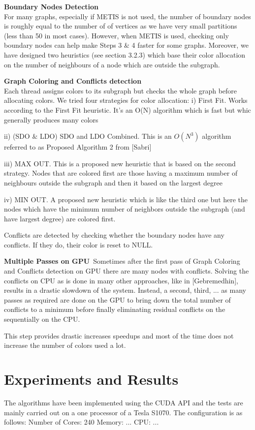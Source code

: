 \documentclass[preprint]{sigplanconf}
\begin{document}
\textbf{Boundary Nodes Detection}\\
For many graphs, especially if METIS is not used, the number of boundary nodes is roughly equal to the number of of vertices as we have very small partitions (less than 50 in most cases). However, when METIS is used, checking only boundary nodes can help make Steps 3 $\&$ 4 faster for some graphs.
Moreover, we have designed two heuristics (see section 3.2.3) which base their color allocation on the number of neighbours of a node which are outside the subgraph.\

\textbf{Graph Coloring  and Conflicts detection}\\
Each thread assigns colors to its subgraph but checks the whole graph before allocating colors. We tried four strategies for color allocation:
i) First Fit. Works according to the First Fit heuristic. It’s an O(N) algorithm which is fast but whic generally produces many colors

ii) (SDO $\&$ LDO) SDO and LDO Combined. This is an $O(N^3)$ algorithm referred to as Proposed Algorithm 2 from [Sabri]

iii) MAX OUT. This is a  proposed new heuristic that is based on the second strategy. Nodes that are colored first are those having a maximum number of neighbours outside the subgraph and then it based on the largest degree

iv) MIN OUT. A proposed new heuristic which is like the third one but here the nodes which have the minimum number of neighbors outside the subgraph (and have largest degree) are colored first.

Conflicts are detected by checking whether the boundary nodes have any conflicts. If they do, their color is reset to NULL.\

\textbf{Multiple Passes on GPU}\
Sometimes after the first pass of Graph Coloring and Conflicts detection on GPU there are many nodes with conflicts. Solving the conflicts on CPU as is done in many other approaches, like in [Gebremedhin], results in a drastic slowdown of the system. Instead, a second, third, ... as many passes as required are done on the GPU to bring down the total number of conflicts to a minimum before finally eliminating residual conflicts on the sequentially on the CPU.

This step provides drastic increases speedups and most of the time does not increase the number of colors used a lot.

\section{Experiments and Results}
The algorithms have been implemented using the CUDA API and the tests are mainly carried out on a  one processor of a Tesla S1070. The configuration is as follows:
Number of Cores: 240
Memory: ...
CPU: ...
\end{document}
